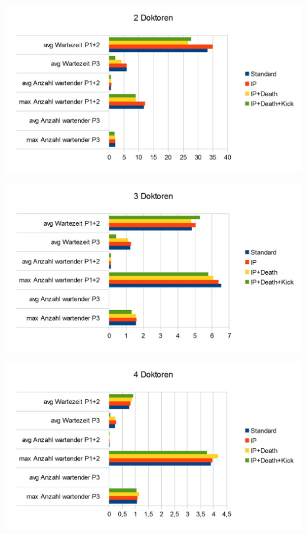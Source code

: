 \documentclass{beamer}
\begin{document}
\begin{frame}
	\includegraphics[scale=0.4]{img/2Doktoren.jpg}
\end{frame}

\begin{frame}
	\includegraphics[scale=0.4]{img/3Doktoren.jpg}
\end{frame}

\begin{frame}
	\includegraphics[scale=0.4]{img/4Doktoren.jpg}
\end{frame}
\end{document}
